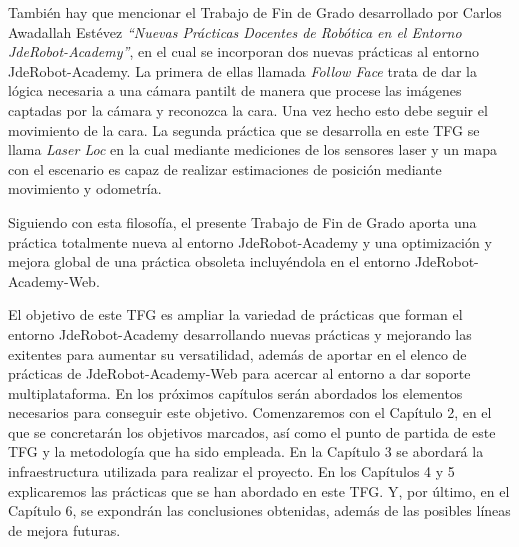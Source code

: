 También hay que mencionar el Trabajo de Fin de Grado desarrollado por Carlos Awadallah Estévez \textit{“Nuevas Prácticas Docentes de Robótica en el  Entorno JdeRobot-Academy”}\cite{tfg3}, en el cual se incorporan dos nuevas prácticas al entorno JdeRobot-Academy. La primera de ellas llamada \textit{Follow Face} trata de dar la lógica necesaria a una cámara pantilt de manera que procese las imágenes captadas por la cámara y reconozca la cara. Una vez hecho esto debe seguir el movimiento de la cara. La segunda práctica que se desarrolla en este TFG se llama \textit{Laser Loc} en la cual mediante mediciones de los sensores laser y un mapa con el escenario es capaz de realizar estimaciones de posición mediante movimiento y odometría.

Siguiendo con esta filosofía, el presente Trabajo de Fin de Grado aporta una práctica totalmente nueva al entorno JdeRobot-Academy y una optimización y mejora global de una práctica obsoleta incluyéndola en el entorno JdeRobot-Academy-Web.

\vspace{3cm}

El objetivo de este TFG es ampliar la variedad de prácticas que forman el entorno JdeRobot-Academy desarrollando nuevas prácticas y mejorando las exitentes para aumentar su versatilidad, además de aportar en el elenco de prácticas de JdeRobot-Academy-Web para acercar al entorno a dar soporte multiplataforma. En los próximos capítulos serán abordados los elementos necesarios para conseguir este objetivo. Comenzaremos con el Capítulo 2, en el que se concretarán los objetivos marcados, así como el punto de partida de este TFG y la metodología que ha sido empleada. En la Capítulo 3 se abordará la infraestructura utilizada para realizar el proyecto. En los Capítulos 4 y 5 explicaremos las prácticas que se han abordado en este TFG. Y, por último, en el Capítulo 6, se expondrán las conclusiones obtenidas, además de las posibles líneas de mejora futuras.

